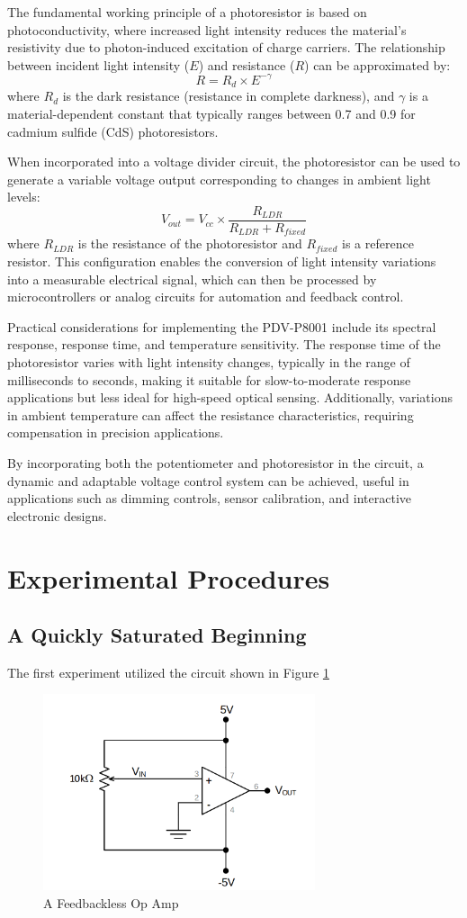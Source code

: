 \documentclass[12pt]{article}
\begin{document}
The fundamental working principle of a photoresistor is based on photoconductivity, where increased light intensity reduces the material’s resistivity due to photon-induced excitation of charge carriers. The relationship between incident light intensity (\(E\)) and resistance (\(R\)) can be approximated by:
\[
	R = R_d \times E^{-\gamma}
\]
where \(R_d\) is the dark resistance (resistance in complete darkness), and \(\gamma\) is a material-dependent constant that typically ranges between 0.7 and 0.9 for cadmium sulfide (CdS) photoresistors.

When incorporated into a voltage divider circuit, the photoresistor can be used to generate a variable voltage output corresponding to changes in ambient light levels:
\[
	V_{out} = V_{cc} \times \frac{R_{LDR}}{R_{LDR} + R_{fixed}}
\]
where \(R_{LDR}\) is the resistance of the photoresistor and \(R_{fixed}\) is a reference resistor. This configuration enables the conversion of light intensity variations into a measurable electrical signal, which can then be processed by microcontrollers or analog circuits for automation and feedback control.

Practical considerations for implementing the PDV-P8001 include its spectral response, response time, and temperature sensitivity. The response time of the photoresistor varies with light intensity changes, typically in the range of milliseconds to seconds, making it suitable for slow-to-moderate response applications but less ideal for high-speed optical sensing. Additionally, variations in ambient temperature can affect the resistance characteristics, requiring compensation in precision applications.

By incorporating both the potentiometer and photoresistor in the circuit, a dynamic and adaptable voltage control system can be achieved, useful in applications such as dimming controls, sensor calibration, and interactive electronic designs.

\section{Experimental Procedures}

\subsection{A Quickly Saturated Beginning}
The first experiment utilized the circuit shown in Figure \ref{fig:first}


\begin{figure}[H]
	\centering
	\includegraphics[width=8cm]{02_2}
	\caption{A Feedbackless Op Amp}
	\label{fig:first}
\end{figure}
\end{document}
